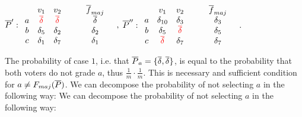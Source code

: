 \documentclass[version=3.21, pagesize, twoside=off, bibliography=totoc, DIV=calc, fontsize=12pt, a4paper]{scrartcl}
\begin{document}
\begin{center}
	$\overline{P}':
	\begin{array}{ccccc}
		& v_1 & v_2 & \quad & \overline{f}_{maj} \\
		a &	{\color{red}\overline{\delta}} & {\color{red}\overline{\delta}} & \quad& \overline{\delta} \\
		b &	\delta_5 & \delta_2 &\quad& \delta_2 \\
		c &	\delta_1 & \delta_7 &\quad& \delta_1 \\
	\end{array} \quad,
	$
	$\overline{P}^{\prime\prime}:
	\begin{array}{ccccc}
		& v_1 & v_2 & \quad & \overline{f}_{maj} \\
		a &	\delta_{10} & \delta_3 & \quad& \delta_3 \\
		b &	\delta_5 & {\color{red}\overline{\delta}} &\quad& \delta_5 \\
		c &	{\color{red}\overline{\delta}} & \delta_7 &\quad& \delta_7 \\
	\end{array} \quad.
	$
\end{center}

The probability of case $1$, i.e. that $\overline{P}_a=\{\overline{\delta},\overline{\delta}\}$, is equal to the probability that both voters do not grade $a$, thus $\frac{1}{m}\cdot\frac{1}{m}$. This is necessary and sufficient condition for $a\neq F_{maj}(\overline{P})$. We can decompose the probability of not selecting $a$ in the following way:
We can decompose the probability of not selecting $a$ in the following way:
\end{document}

